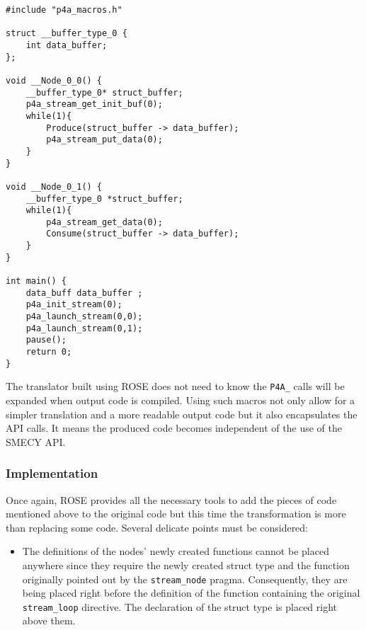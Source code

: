 \documentclass [A4]{article}
\begin{document}
	\begin{lstlisting}[label=macros,caption={Streaming output code with macro calls. Definitions of functions \texttt{Produce} and \texttt{Consume} are not shown.}]
#include "p4a_macros.h" 

struct __buffer_type_0 {
	int data_buffer;
};

void __Node_0_0() {
	__buffer_type_0* struct_buffer;
	p4a_stream_get_init_buf(0);
	while(1){
		Produce(struct_buffer -> data_buffer);
		p4a_stream_put_data(0);
	}
}

void __Node_0_1() {
	__buffer_type_0 *struct_buffer;
	while(1){
		p4a_stream_get_data(0);
		Consume(struct_buffer -> data_buffer);
	}
}

int main() {
	data_buff data_buffer ;
	p4a_init_stream(0);
	p4a_launch_stream(0,0);
	p4a_launch_stream(0,1);
	pause();
	return 0;
}
	\end{lstlisting}
	
	The translator built using ROSE does not need to know the \verb+P4A_+ calls will be expanded when output code is compiled. Using such macros not only allow for a simpler translation and a more readable output code but it also encapsulates the API calls. It means the produced code becomes independent of the use of the SMECY API.
	
	\subsubsection{Implementation} Once again, ROSE provides all the necessary tools to add the pieces of code mentioned above to the original code but this time the transformation is more than replacing some code. Several delicate points must be considered:
	\begin{itemize}
		\item The definitions of the nodes' newly created functions cannot be placed anywhere since they require the newly created struct type and the function originally pointed out by the \verb+stream_node+ pragma. Consequently, they are being placed right before the definition of the function containing the original \verb+stream_loop+ directive. The declaration of the struct type is placed right above them.
	\end{itemize}
	
	
\end{document}

